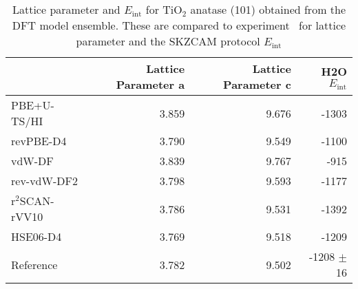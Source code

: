 \begin{table}
\caption{\label{tab:lattice_parametersa-tio2}Lattice parameter and  $E_\textrm{int}$ for TiO$_2$ anatase (101) obtained from the DFT model ensemble. These are compared to experiment~\cite{burdettStructuralelectronicRelationshipsInorganic1987} for lattice parameter and the SKZCAM protocol $E_\textrm{int}$}
\begin{tabular}{lrrr}
\toprule
 & Lattice Parameter a & Lattice Parameter c & H2O $E_\textrm{int}$ \\ 
\midrule
PBE+U-TS/HI & 3.859 & 9.676 & -1303 \\
revPBE-D4 & 3.790 & 9.549 & -1100 \\
vdW-DF & 3.839 & 9.767 & -915 \\
rev-vdW-DF2 & 3.798 & 9.593 & -1177 \\
r$^2$SCAN-rVV10 & 3.786 & 9.531 & -1392 \\
HSE06-D4 & 3.769 & 9.518 & -1209 \\
Reference & 3.782 & 9.502 & -1208 $\pm$ 16 \\
\bottomrule
\end{tabular}
\end{table}